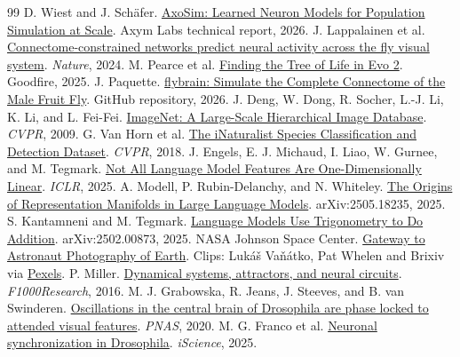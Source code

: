 \documentclass[11pt]{article}
\begin{document}
\begin{thebibliography}{99}
 D. Wiest and J. Sch\"afer. \href{https://axym.org/work/axosim/}{AxoSim: Learned Neuron Models for Population Simulation at Scale}. Axym Labs technical report, 2026.
 J. Lappalainen et al. \href{https://doi.org/10.1038/s41586-024-07939-3}{Connectome-constrained networks predict neural activity across the fly visual system}. \textit{Nature}, 2024.
 M. Pearce et al. \href{https://www.goodfire.com/research/phylogeny-manifold}{Finding the Tree of Life in Evo 2}. Goodfire, 2025.
 J. Paquette. \href{https://github.com/jppaquet/flybrain}{flybrain: Simulate the Complete Connectome of the Male Fruit Fly}. GitHub repository, 2026.
 J. Deng, W. Dong, R. Socher, L.-J. Li, K. Li, and L. Fei-Fei. \href{https://doi.org/10.1109/CVPR.2009.5206848}{ImageNet: A Large-Scale Hierarchical Image Database}. \textit{CVPR}, 2009.
 G. Van Horn et al. \href{https://doi.org/10.1109/CVPR.2018.00914}{The iNaturalist Species Classification and Detection Dataset}. \textit{CVPR}, 2018.
 J. Engels, E. J. Michaud, I. Liao, W. Gurnee, and M. Tegmark. \href{https://arxiv.org/abs/2405.14860}{Not All Language Model Features Are One-Dimensionally Linear}. \textit{ICLR}, 2025.
 A. Modell, P. Rubin-Delanchy, and N. Whiteley. \href{https://arxiv.org/abs/2505.18235}{The Origins of Representation Manifolds in Large Language Models}. arXiv:2505.18235, 2025.
 S. Kantamneni and M. Tegmark. \href{https://arxiv.org/abs/2502.00873}{Language Models Use Trigonometry to Do Addition}. arXiv:2502.00873, 2025.
 NASA Johnson Space Center. \href{https://eol.jsc.nasa.gov/}{Gateway to Astronaut Photography of Earth}. Clips: Lukáš Vaňátko, Pat Whelen and Brixiv via \href{https://www.pexels.com/}{Pexels}.
 P. Miller. \href{https://doi.org/10.12688/f1000research.7698.1}{Dynamical systems, attractors, and neural circuits}. \textit{F1000Research}, 2016.
 M. J. Grabowska, R. Jeans, J. Steeves, and B. van Swinderen. \href{https://doi.org/10.1073/pnas.2010749117}{Oscillations in the central brain of Drosophila are phase locked to attended visual features}. \textit{PNAS}, 2020.
 M. G. Franco et al. \href{https://doi.org/10.1016/j.isci.2025.112942}{Neuronal synchronization in Drosophila}. \textit{iScience}, 2025.
\end{thebibliography}
\end{document}
